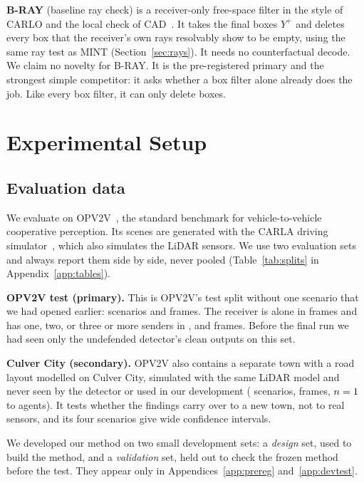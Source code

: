 \documentclass[conference]{IEEEtran}
\newcommand{\mint}{MINT}
\begin{document}
\textbf{B-RAY} (baseline ray check) is a receiver-only free-space filter in the style of CARLO and the local check of
CAD~\cite{sun2020carlo,zhang2024cad}. It takes the final boxes $Y^{+}$ and deletes every box that the receiver's
own rays resolvably show to be empty, using the same ray test as \mint{} (Section~\ref{sec:rays}). It needs no
counterfactual decode. We claim no novelty for B-RAY. It is the pre-registered primary and the strongest
simple competitor: it asks whether a box filter alone already does the job. Like every box filter, it can only
delete boxes.

\section{Experimental Setup}
\label{sec:setup}
\subsection{Evaluation data}
\label{sec:data}
We evaluate on OPV2V~\cite{xu2022opv2v}, the standard benchmark for vehicle-to-vehicle cooperative perception.
Its scenes are generated with the CARLA driving simulator~\cite{dosovitskiy2017carla}, which also simulates
the LiDAR sensors. We use two evaluation sets and always report them side by side, never pooled
(Table~\ref{tab:splits} in Appendix~\ref{app:tables}).

\textbf{OPV2V test (primary).} This is OPV2V's test split without one scenario that we had opened earlier:
\TestScenarios{} scenarios and \TestFrames{} frames. The receiver is alone in \TestNOne{} frames and has one,
two, or three or more senders in \TestNTwo, \TestNThree{} and \TestNFourPlus{} frames. Before the final run we
had seen only the undefended detector's clean outputs on this set.

\textbf{Culver City (secondary).} OPV2V also contains a separate town with a road layout modelled on Culver
City, simulated with the same LiDAR model and never seen by the detector or used in our development
(\CulScenarios{} scenarios, \CulFrames{} frames, $n=1$ to \CulNmax{} agents). It tests whether the findings
carry over to a new town, not to real sensors, and its four scenarios give wide confidence intervals.

We developed our method on two small development sets: a \emph{design} set, used to build the method, and a
\emph{validation} set, held out to check the frozen method before the test. They appear only in
Appendices~\ref{app:prereg} and~\ref{app:devtest}.
\end{document}

